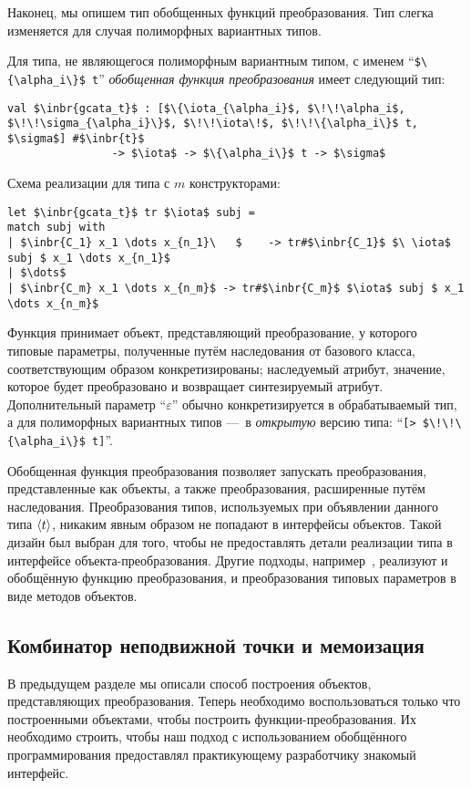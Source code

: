 Наконец, мы опишем тип обобщенных функций преобразования. Тип слегка изменяется для случая полиморфных вариантных типов.

Для типа, не являющегося полиморфным вариантным типом, с именем ``\lstinline|$\{\alpha_i\}$ t|'' \emph{обобщенная функция преобразования} имеет следующий тип:

\begin{lstlisting}
val $\inbr{gcata_t}$ : [$\{\iota_{\alpha_i}$, $\!\!\alpha_i$, $\!\!\sigma_{\alpha_i}\}$, $\!\!\iota\!$, $\!\!\{\alpha_i\}$ t, $\sigma$] #$\inbr{t}$ 
                -> $\iota$ -> $\{\alpha_i\}$ t -> $\sigma$
\end{lstlisting}
Схема реализации для типа с $m$ конструкторами:
\begin{lstlisting}
let $\inbr{gcata_t}$ tr $\iota$ subj = 
match subj with 
| $\inbr{C_1} x_1 \dots x_{n_1}\   $    -> tr#$\inbr{C_1}$ $\ \iota$ subj $ x_1 \dots x_{n_1}$
| $\dots$
| $\inbr{C_m} x_1 \dots x_{n_m}$ -> tr#$\inbr{C_m}$ $\iota$ subj $ x_1 \dots x_{n_m}$
\end{lstlisting}

Функция принимает объект, представляющий преобразование, у которого типовые параметры, полученные путём наследования от базового класса, соответствующим образом конкретизированы; наследуемый атрибут, значение, которое будет преобразовано и возвращает синтезируемый атрибут.
Дополнительный параметр ``$\varepsilon$'' обычно конкретизируется в обрабатываемый тип, а 
для полиморфных вариантных типов ---~в \emph{открытую}
версию типа:  ``\lstinline|[> $\!\!\{\alpha_i\}$ t]|''. 

Обобщенная функция преобразования позволяет запускать   преобразования, представленные как объекты, а также преобразования, расширенные путём наследования. Преобразования типов, используемых при объявлении данного типа $\left<t\right>$, никаким явным образом не попадают в интерфейсы объектов. Такой дизайн был выбран для того, чтобы не предоставлять детали реализации типа в интерфейсе объекта-преобразования. Другие подходы, например~\cite{Visitors},  реализуют и обобщённую функцию преобразования, и преобразования типовых параметров в виде методов объектов.


\subsection{Комбинатор неподвижной точки и мемоизация}
\label{memofix}

В предыдущем разделе мы описали способ построения объектов, представляющих преобразования. Теперь необходимо воспользоваться только что построенными объектами, чтобы построить функции-преобразования. Их необходимо строить, чтобы наш подход с использованием обобщённого программирования предоставлял практикующему разработчику знакомый интерфейс.

